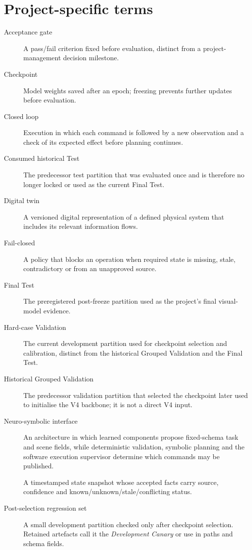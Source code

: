 \section*{Project-specific terms}
\begin{description}
  \item[Acceptance gate] A pass/fail criterion fixed before evaluation, distinct
  from a project-management decision milestone.
  \item[Checkpoint] Model weights saved after an epoch; freezing prevents further
  updates before evaluation.
  \item[Closed loop] Execution in which each command is followed by a new
  observation and a check of its expected effect before planning continues.
  \item[Consumed historical Test] The predecessor test partition that was
  evaluated once and is therefore no longer locked or used as the current Final
  Test.
  \item[Digital twin] A versioned digital representation of a defined physical
  system that includes its relevant information flows.
  \item[Fail-closed] A policy that blocks an operation when required state is
  missing, stale, contradictory or from an unapproved source.
  \item[Final Test] The preregistered post-freeze partition used as the
  project's final visual-model evidence.
  \item[Hard-case Validation] The current development partition used for
  checkpoint selection and calibration, distinct from the historical Grouped
  Validation and the Final Test.
  \item[Historical Grouped Validation] The predecessor validation partition
  that selected the checkpoint later used to initialise the V4 backbone; it is
  not a direct V4 input.
  \item[Neuro-symbolic interface] An architecture in which learned components
  propose fixed-schema task and scene fields, while deterministic validation,
  symbolic planning and the software execution supervisor determine which
  commands may be published.
  \item[] A timestamped state snapshot whose accepted facts
  carry source, confidence and known/unknown/stale/conflicting status.
  \item[Post-selection regression set] A small development partition checked
  only after checkpoint selection. Retained artefacts call it the
  \emph{Development Canary} or use  in paths and schema fields.

\end{description}
